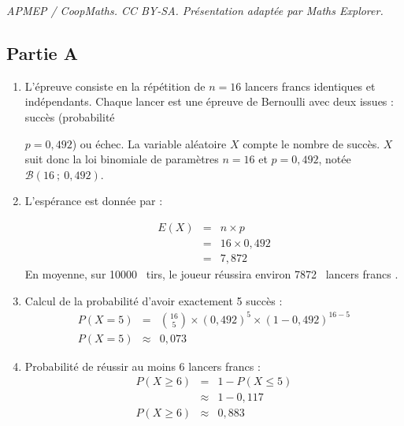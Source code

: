 \documentclass[10pt]{article}
\providecommand{\np}[2][]{{#2~#1}}
\begin{document}
\noindent\textit{APMEP / CoopMaths. CC BY-SA. Présentation adaptée par Maths Explorer.}\par\medskip
\subsection*{Partie A}
\begin{enumerate}
\item L'épreuve consiste en la répétition de $n = 16$ lancers francs identiques et indépendants. Chaque lancer est une épreuve de Bernoulli avec deux issues : succès (probabilité 

$p = 0,492$) ou échec. La variable aléatoire $X$ compte le nombre de succès. $X$ suit donc la loi binomiale de paramètres $n = 16$ et $p = 0,492$, notée $\mathcal{B}(16~;~0,492)$.

\item L'espérance est donnée par :

\[\begin{array}{rcl}
E(X) &=& n \times p \\
&=& 16 \times 0,492 \\
&=& 7,872
\end{array}\]
En moyenne, sur \np{10000} tirs, le joueur réussira environ \np{7872} lancers francs .

\item Calcul de la probabilité d'avoir exactement 5 succès :
\[
\begin{array}{rcl}
P(X = 5) &=& \binom{16}{5} \times (0,492)^5 \times (1 - 0,492)^{16 - 5} \\
P(X = 5)&\approx& 0,073
\end{array}
\]

\item Probabilité de réussir au moins 6 lancers francs :
\[
\begin{array}{rcl}
P(X \geqslant 6) &=& 1 - P(X \leqslant 5) \\
&\approx& 1 - 0,117 \\
P(X \geqslant 6)&\approx& 0,883
\end{array}
\]
\end{enumerate}
\end{document}
